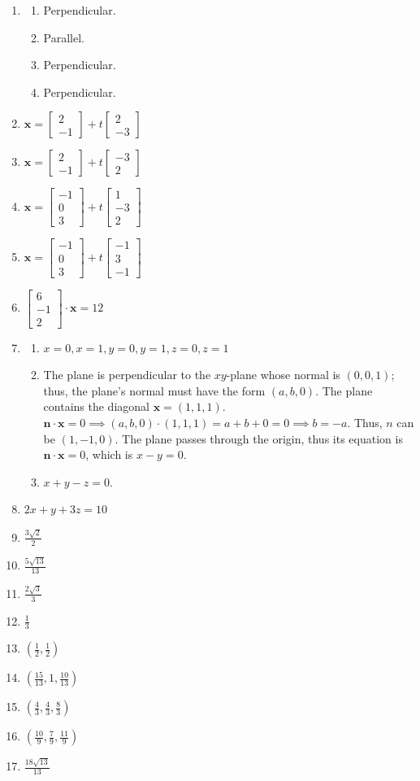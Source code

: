 \documentclass{article}
\newcommand{\vx}{\mathbf{x}}
\newcommand{\vn}{\mathbf{n}}
\newcommand{\colvecTwo}[2]{
  \begin{bmatrix}
    #1 \\
    #2
  \end{bmatrix}
}
\newcommand{\colvecThree}[3]{
  \begin{bmatrix}
    #1 \\
    #2 \\
    #3
  \end{bmatrix}
}
\begin{document}
\begin{enumerate}
\begin{enumerate}
      \item Parallel.
      \item Perpendicular.
    \end{enumerate}
  \item
    \begin{enumerate}
      \item Perpendicular.
      \item Parallel.
      \item Perpendicular.
      \item Perpendicular.
    \end{enumerate}
  \item $\vx=\colvecTwo{2}{-1}+t\colvecTwo{2}{-3}$
  \item $\vx=\colvecTwo{2}{-1}+t\colvecTwo{-3}{2}$
  \item $\vx=\colvecThree{-1}{0}{3}+t\colvecThree{1}{-3}{2}$
  \item $\vx=\colvecThree{-1}{0}{3}+t\colvecThree{-1}{3}{-1}$
  \item $\colvecThree{6}{-1}{2}\cdot\vx=12$
  \item
    \begin{enumerate}
      \item $x=0, x=1, y=0, y=1, z=0, z=1$
      \item The plane is perpendicular to the $xy$-plane whose normal is $(0, 0, 1)$; thus, the
        plane's normal must have the form $(a, b, 0)$. The plane contains the diagonal
        $\vx=(1, 1, 1)$. $\mathbf{n}\cdot\vx=0\implies(a, b, 0)\cdot(1, 1, 1)=a+b+0=0 \implies
        b=-a$. Thus, $n$ can be $(1, -1, 0)$. The plane passes through the origin, thus its equation
        is $\vn\cdot\vx=0$, which is $x-y=0$.
      \item $x+y-z=0$.
    \end{enumerate}
  \item $2x+y+3z=10$
  \item $\frac{3\sqrt{2}}{2}$
  \item $\frac{5\sqrt{13}}{13}$
  \item $\frac{2\sqrt{3}}{3}$
  \item $\frac{1}{3}$
  \item $\left(\frac{1}{2}, \frac{1}{2}\right)$
  \item $\left(\frac{15}{13}, 1, \frac{10}{13}\right)$
  \item $\left(\frac{4}{3}, \frac{4}{3}, \frac{8}{3}\right)$
  \item $\left(\frac{10}{9}, \frac{7}{9}, \frac{11}{9}\right)$
  \item $\frac{18\sqrt{13}}{13}$

\end{enumerate}
\end{document}
